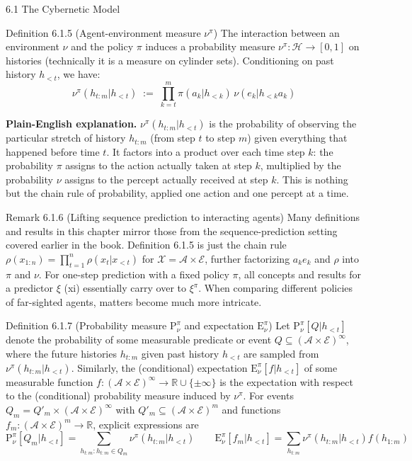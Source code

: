 \documentclass[aspectratio=169,10pt]{beamer}
\newcommand{\A}{\mathcal{A}}
\newcommand{\Ecal}{\mathcal{E}}
\newcommand{\Hcal}{\mathcal{H}}
\begin{document}
\begin{frame}[allowframebreaks]{6.1 The Cybernetic Model}
\begin{block}{Definition 6.1.5 (Agent-environment measure $\nu^\pi$)}
The interaction between an environment $\nu$ and the policy $\pi$ induces a
probability measure $\nu^\pi : \Hcal \to [0,1]$ on histories (technically it
is a measure on cylinder sets). Conditioning on past history $h_{<t}$, we
have:
\[
  \nu^\pi(h_{t:m}|h_{<t}) \;:=\; \prod_{k=t}^{m} \pi(a_k|h_{<k})\,\nu(e_k|h_{<k}a_k)
\]
\end{block}

\textbf{Plain-English explanation.} $\nu^\pi(h_{t:m}|h_{<t})$ is the
probability of observing the particular stretch of history $h_{t:m}$ (from
step $t$ to step $m$) given everything that happened before time $t$. It
factors into a product over each time step $k$: the probability $\pi$
assigns to the action actually taken at step $k$, multiplied by the
probability $\nu$ assigns to the percept actually received at step $k$.
This is nothing but the chain rule of probability, applied one action and
one percept at a time.

\framebreak

\begin{block}{Remark 6.1.6 (Lifting sequence prediction to interacting agents)}
Many definitions and results in this chapter mirror those from the
sequence-prediction setting covered earlier in the book. Definition 6.1.5
is just the chain rule $\rho(x_{1:n}) = \prod_{t=1}^{n} \rho(x_t|x_{<t})$
for $\mathcal{X} = \A \times \Ecal$, further factorizing $a_k e_k$ and
$\rho$ into $\pi$ and $\nu$. For one-step prediction with a fixed policy
$\pi$, all concepts and results for a predictor $\xi$ (xi) essentially carry
over to $\xi^\pi$. When comparing different policies of far-sighted agents,
matters become much more intricate.
\end{block}

\begin{block}{Definition 6.1.7 (Probability measure $\mathrm{P}^\pi_\nu$ and expectation $\mathrm{E}^\pi_\nu$)}
Let $\mathrm{P}^\pi_\nu[Q|h_{<t}]$ denote the probability of some measurable
predicate or event $Q \subseteq (\A \times \Ecal)^\infty$, where the future
histories $h_{t:m}$ given past history $h_{<t}$ are sampled from
$\nu^\pi(h_{t:m}|h_{<t})$. Similarly, the (conditional) expectation
$\mathrm{E}^\pi_\nu[f|h_{<t}]$ of some measurable function
$f: (\A\times\Ecal)^\infty \to \mathbb{R}\cup\{\pm\infty\}$ is the
expectation with respect to the (conditional) probability measure induced
by $\nu^\pi$. For events $Q_m = Q'_m \times (\A\times\Ecal)^\infty$ with
$Q'_m \subseteq (\A\times\Ecal)^m$ and functions
$f_m : (\A\times\Ecal)^m \to \mathbb{R}$, explicit expressions are
\[
  \mathrm{P}^\pi_\nu[Q_m|h_{<t}] = \sum_{h_{t:m}:h_{t:m}\in Q_m} \nu^\pi(h_{t:m}|h_{<t})
  \qquad
  \mathrm{E}^\pi_\nu[f_m|h_{<t}] = \sum_{h_{t:m}} \nu^\pi(h_{t:m}|h_{<t}) f(h_{1:m})
\]
\end{block}


\end{frame}
\end{document}
